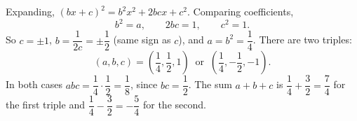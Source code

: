 Expanding, $(bx+c)^2=b^2x^2+2bcx+c^2$. Comparing coefficients,
\[
b^2=a,\qquad 2bc=1,\qquad c^2=1 .
\]
So $c=\pm1$, $b=\dfrac{1}{2c}=\pm\dfrac{1}{2}$ (same sign as $c$), and $a=b^2=\dfrac{1}{4}$. There are two triples:
\[
\boxed{(a,b,c)=\left(\dfrac{1}{4},\dfrac{1}{2},1\right)\ \text{ or }\ \left(\dfrac{1}{4},-\dfrac{1}{2},-1\right).}
\]
In both cases $abc=\dfrac{1}{4}\cdot\dfrac{1}{2}=\dfrac{1}{8}$, since $bc=\dfrac{1}{2}$. The sum $a+b+c$ is $\dfrac{1}{4}+\dfrac{3}{2}=\dfrac{7}{4}$ for the first triple and $\dfrac{1}{4}-\dfrac{3}{2}=-\dfrac{5}{4}$ for the second.
